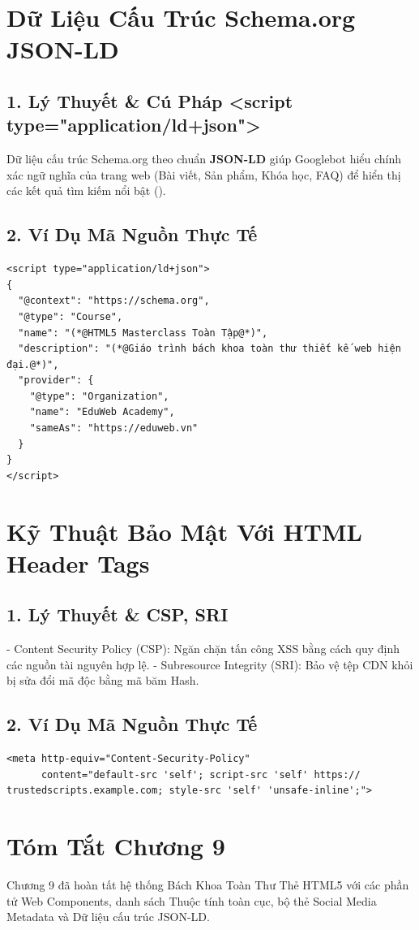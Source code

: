 \section{Dữ Liệu Cấu Trúc Schema.org JSON-LD}
\subsection{1. Lý Thuyết \& Cú Pháp <script type="application/ld+json">}
Dữ liệu cấu trúc Schema.org theo chuẩn \textbf{JSON-LD} giúp Googlebot hiểu chính xác ngữ nghĩa của trang web (Bài viết, Sản phẩm, Khóa học, FAQ) để hiển thị các kết quả tìm kiếm nổi bật ().

\subsection{2. Ví Dụ Mã Nguồn Thực Tế}
\begin{lstlisting}[language=HTML5, caption={Ví dụ khai báo dữ liệu cấu trúc Khóa Học chuẩn Google Rich Results}]
<script type="application/ld+json">
{
  "@context": "https://schema.org",
  "@type": "Course",
  "name": "(*@HTML5 Masterclass Toàn Tập@*)",
  "description": "(*@Giáo trình bách khoa toàn thư thiết kế web hiện đại.@*)",
  "provider": {
    "@type": "Organization",
    "name": "EduWeb Academy",
    "sameAs": "https://eduweb.vn"
  }
}
</script>
\end{lstlisting}

\section{Kỹ Thuật Bảo Mật Với HTML Header Tags}
\subsection{1. Lý Thuyết \& CSP, SRI}
- Content Security Policy (CSP): Ngăn chặn tấn công XSS bằng cách quy định các nguồn tài nguyên hợp lệ.
- Subresource Integrity (SRI): Bảo vệ tệp CDN khỏi bị sửa đổi mã độc bằng mã băm Hash.

\subsection{2. Ví Dụ Mã Nguồn Thực Tế}
\begin{lstlisting}[language=HTML5, caption={Ví dụ cấu hình Content Security Policy trong thẻ meta}]
<meta http-equiv="Content-Security-Policy" 
      content="default-src 'self'; script-src 'self' https:// trustedscripts.example.com; style-src 'self' 'unsafe-inline';">
\end{lstlisting}

\section{Tóm Tắt Chương 9}
Chương 9 đã hoàn tất hệ thống Bách Khoa Toàn Thư Thẻ HTML5 với các phần tử Web Components, danh sách Thuộc tính toàn cục, bộ thẻ Social Media Metadata và Dữ liệu cấu trúc JSON-LD.
